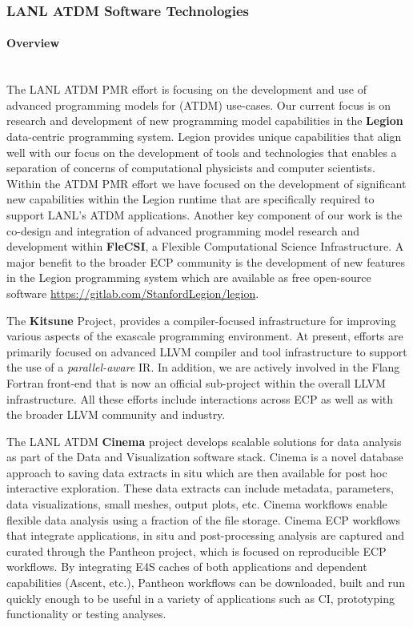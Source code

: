 \subsubsection{ LANL ATDM Software Technologies}

\paragraph{Overview} \leavevmode \\

The LANL ATDM PMR effort is focusing on the development and use of
advanced programming models for (ATDM) use-cases. Our current focus is on research and development
of new programming model capabilities in the \textbf{Legion} data-centric
programming system. Legion provides unique capabilities that align
well with our focus on the development of tools and technologies that
enables a separation of concerns of computational physicists and
computer scientists. Within the ATDM PMR effort we have focused on the
development of significant new capabilities within the Legion runtime
that are specifically required to support LANL's ATDM
applications. Another key component of our work is the co-design and
integration of advanced programming model research and development
within \textbf{FleCSI}, a Flexible Computational Science Infrastructure. A
major benefit to the broader ECP community is the development of new 
features in the Legion programming system which are available as free
open-source software \url{https://gitlab.com/StanfordLegion/legion}.  

The \textbf{Kitsune} Project, provides a compiler-focused infrastructure
for improving various aspects of the exascale programming environment.
At present, efforts are primarily focused on advanced LLVM compiler and
tool infrastructure to support the use of a \emph{parallel-aware} IR.
In addition, we are actively involved in the Flang Fortran
front-end that is now an official sub-project within the overall LLVM
infrastructure. All these efforts include interactions across ECP as well as
with the broader LLVM community and industry.  


The LANL ATDM \textbf{Cinema} project develops scalable solutions for data analysis as part of the Data and Visualization software stack.
Cinema is a novel database approach to saving data extracts in situ which are then available for post hoc interactive exploration.  These data extracts can include metadata, parameters, data visualizations, small meshes, output plots, etc.  Cinema workflows enable flexible data analysis using a fraction of the file storage.  Cinema ECP workflows that integrate applications, in situ and post-processing analysis are captured and curated through the Pantheon project, which is focused on reproducible ECP workflows.  By integrating E4S caches of both applications and dependent capabilities (Ascent, etc.), Pantheon workflows can be downloaded, built and run quickly enough to be useful in a variety of applications such as CI, prototyping functionality or testing analyses.  

